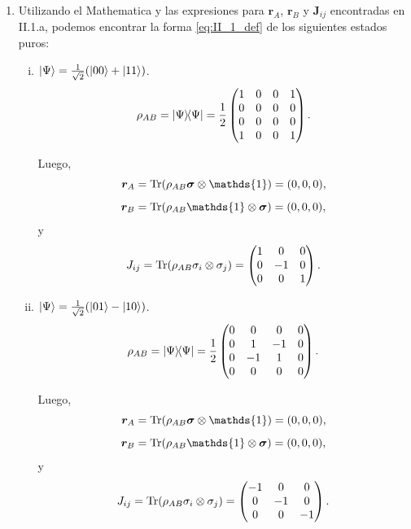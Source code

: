 \documentclass{scrartcl}
\newcommand{\inv}[1]{\frac{1}{#1}}
\renewcommand{\vb}[1]{\bm{#1}}
\DeclareRobustCommand{\[}{\begin{equation}}
\DeclareRobustCommand{\]}{\end{equation}}
\begin{document}
\begin{enumerate}
\begin{enumerate}
        
        \item Utilizando el Mathematica y las expresiones para $\vb{r}_A$, $\vb{r}_B$ y $\vb{J}_{ij}$ encontradas en II.1.a, podemos encontrar la forma \eqref{eq:II_1_def} de los siguientes estados puros:
        \begin{enumerate}[(i)]
            \item $\ket{\Psi} = \inv{\sqrt{2}} (\ket{00} + \ket{11})$.
            \[
                \rho_{AB} = \dyad{\Psi}{\Psi} = \inv{2}
                \begin{pmatrix}
                    1 & 0 & 0 & 1 \\
                    0 & 0 & 0 & 0 \\
                    0 & 0 & 0 & 0 \\
                    1 & 0 & 0 & 1
                \end{pmatrix}.
            \]
            
            Luego,
            \[ \vb{r}_A = \Tr(\rho_{AB} \vb{\sigma} \otimes \mathds{1}) = (0, 0, 0), \]
            \[ \vb{r}_B = \Tr(\rho_{AB} \mathds{1} \otimes \vb{\sigma}) = (0, 0, 0), \]
            y
            \[
                J_{ij} = \Tr(\rho_{AB} \sigma_i \otimes \sigma_j) =
                \begin{pmatrix}
                    1 & 0 & 0 \\
                    0 & -1 & 0 \\
                    0 & 0 & 1 \\
                \end{pmatrix}.
            \]
            
            
            \item $\ket{\Psi} = \inv{\sqrt{2}} (\ket{01} - \ket{10})$.
            \[
                \rho_{AB} = \dyad{\Psi}{\Psi} = \inv{2}
                \begin{pmatrix}
                    0 & 0 & 0 & 0 \\
                    0 & 1 & -1 & 0 \\
                    0 & -1 & 1 & 0 \\
                    0 & 0 & 0 & 0
                \end{pmatrix}.
            \]
            
            Luego,
            \[ \vb{r}_A = \Tr(\rho_{AB} \vb{\sigma} \otimes \mathds{1}) = (0, 0, 0), \]
            \[ \vb{r}_B = \Tr(\rho_{AB} \mathds{1} \otimes \vb{\sigma}) = (0, 0, 0), \]
            y
            \[
                J_{ij} = \Tr(\rho_{AB} \sigma_i \otimes \sigma_j) =
                \begin{pmatrix}
                    -1 & 0 & 0 \\
                    0 & -1 & 0 \\
                    0 & 0 & -1 \\
                \end{pmatrix}.
            \]
            

\end{enumerate}
\end{enumerate}
\end{enumerate}
\end{document}
